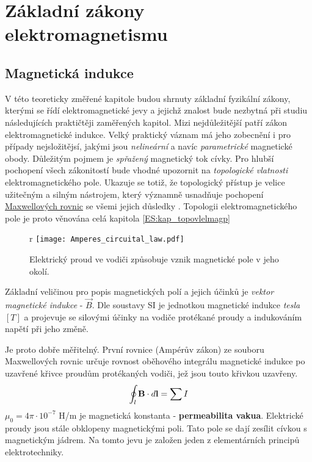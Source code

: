\chapter{Základní zákony elektromagnetismu}\label{ES:kap_zaklzelmg}
\minitoc
\newpage
  \section{Magnetická indukce}
    V této teoreticky změřené kapitole budou shrnuty základní fyzikální zákony, kterými se řídí
    elektromagnetické jevy a jejichž znalost bude nezbytná při studiu následujících praktičtěji
    zaměřených kapitol. Mizi nejdůležitější patří zákon elektromagnetické indukce. Velký praktický
    váznam má jeho zobecnění i pro případy nejsložitějsí, jakými jsou \emph{nelineární} a navíc
    \emph{parametrické} magnetické obody. Důležitým pojmem je \emph{spřažený} magnetický tok cívky.
    Pro hlubší pochopení všech zákonitostí bude vhodné upozornit na \emph{topologické vlatnosti}
    elektromagnetického pole. Ukazuje se totiž, že topologický přístup je velice užitečným a silným
    nástrojem, který významně usnadňuje pochopení
    \href{http://en.wikipedia.org/wiki/Maxwell_theory}{Maxwellových rovnic} se všemi jejich důsledky
    \cite[s.~6]{Patocka4}. Topologii elektromagnetického pole je proto věnována celá kapitola
    \ref{ES:kap_topovlelmagp}

    \begin{figure}{r}
      \centering
      \texttt{[image: Amperes\_circuital\_law.pdf]}
      \caption{Elektrický proud ve vodiči způsobuje vznik magnetické pole v jeho okolí.}
      \label{ES:fig_amp_law}
    \end{figure}   
    Základní veličinou pro popis magnetických polí a jejich účinků je \emph{vektor magnetické
    indukce} - \(\vec{B}\). Dle soustavy SI je jednotkou magnetické indukce \emph{tesla} \([T]\) a
    projevuje se silovými účinky na vodiče protékané proudy a indukováním napětí při jeho změně.

    Je proto dobře měřitelný. První rovnice (Ampérův zákon) ze souboru Maxwellových rovnic určuje
    rovnost oběhového integrálu magnetické indukce po uzavřené křivce proudům protékaných vodiči,
    jež jsou touto křivkou uzavřeny.
    \begin{equation}\label{es:eq_amp_law}
      \oint_l \mathbf{B} \cdot d\mathbf{l} = \sum I
    \end{equation}
    $\mu_0 = 4\pi\cdot 10^{-7}$ 
    H/m je magnetická konstanta - \textbf{permeabilita vakua}. Elektrické proudy jsou stále
    obklopeny magnetickými poli. Tato pole se dají zesílit cívkou s magnetickým jádrem. Na tomto
    jevu je založen jeden z elementárních principů elektrotechniky.
    
